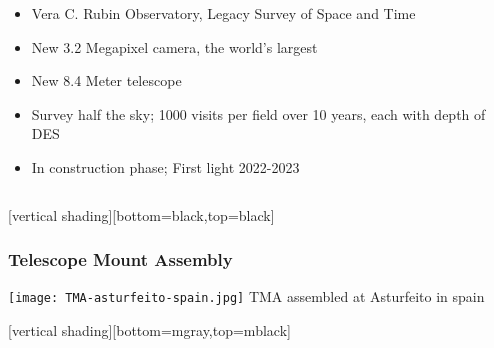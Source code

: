 \documentclass{beamer}
\begin{document}
{\begin{columns}
\begin{column}{0.5\textwidth}
\begin{itemize}
                \item Vera C. Rubin Observatory,  Legacy Survey of Space and Time

                \item New 3.2 Megapixel camera, the world's largest

                \item New 8.4 Meter telescope

                \item Survey half the sky; 1000 visits per field over 10 years, each
                    with depth of DES 

                \item In construction phase; First light 2022-2023

            \end{itemize}
        \end{column}


    \end{columns}
}

{
    [vertical shading][bottom=black,top=black]
	
    \frame
    {
        \frametitle{Telescope Mount Assembly}
        \begin{center}
            \texttt{[image: TMA-asturfeito-spain.jpg]}
            \newline
            {\tiny TMA assembled at Asturfeito in spain}
        \end{center}
    }

    [vertical shading][bottom=mgray,top=mblack]

}
\end{document}
